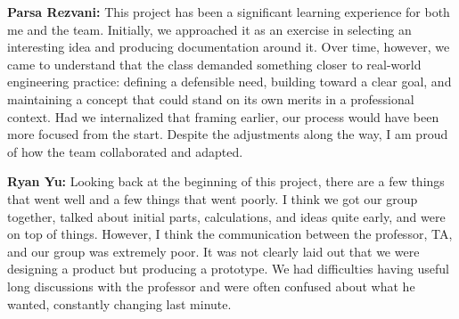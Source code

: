 \documentclass[journal, onecolumn]{IEEEtran}
\begin{document}
\textbf{Parsa Rezvani:} This project has been a significant learning experience for both me and the team. Initially, we approached it as an exercise in selecting an interesting idea and producing documentation around it. Over time, however, we came to understand that the class demanded something closer to real-world engineering practice: defining a defensible need, building toward a clear goal, and maintaining a concept that could stand on its own merits in a professional context. Had we internalized that framing earlier, our process would have been more focused from the start. Despite the adjustments along the way, I am proud of how the team collaborated and adapted.

\vspace{1em}

\textbf{Ryan Yu:} Looking back at the beginning of this project, there are a few things that went well and a few things that went poorly. I think we got our group together, talked about initial parts, calculations, and ideas quite early, and were on top of things. However, I think the communication between the professor, TA, and our group was extremely poor. It was not clearly laid out that we were designing a product but producing a prototype. We had difficulties having useful long discussions with the professor and were often confused about what he wanted, constantly changing last minute.


\nocite{*}

\end{document}
